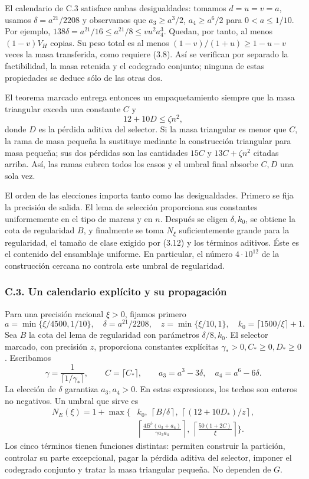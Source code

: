 \documentclass[spanish,11pt,a4paper]{article}
\begin{document}
El calendario de C.3 satisface ambas desigualdades: tomamos \(d=u=v=a\), usamos \(\delta=a^{21}/2208\) y observamos que \(a_3\ge a^3/2\), \(a_4\ge a^6/2\) para \(0<a\le1/10\). Por ejemplo, \(138\delta=a^{21}/16\le a^{21}/8\le vu^2a_4^3\). Quedan, por tanto, al menos \((1-v)V_H\) copias. Su peso total es al menos \((1-v)/(1+u)\ge1-u-v\) veces la masa transferida, como requiere (3.8). Así se verifican por separado la factibilidad, la masa retenida y el codegrado conjunto; ninguna de estas propiedades se deduce sólo de las otras dos.

El teorema marcado entrega entonces un empaquetamiento siempre que la masa triangular exceda una constante \(C\) y \[
12+10D\le\zeta n^2,
\tag{3.14}
\] donde \(D\) es la pérdida aditiva del selector. Si la masa triangular es menor que \(C\), la rama de masa pequeña la sustituye mediante la construcción triangular para masa pequeña; sus dos pérdidas son las cantidades \(15C\) y \(13C+\zeta n^2\) citadas arriba. Así, las ramas cubren todos los casos y el umbral final absorbe \(C,D\) una sola vez.

El orden de las elecciones importa tanto como las desigualdades. Primero se fija la precisión de salida. El lema de selección proporciona sus constantes uniformemente en el tipo de marcas y en \(n\). Después se eligen \(\delta,k_0\), se obtiene la cota de regularidad \(B\), y finalmente se toma \(N_\xi\) suficientemente grande para la regularidad, el tamaño de clase exigido por (3.12) y los términos aditivos. Éste es el contenido del ensamblaje uniforme. En particular, el número \(4\cdot10^{12}\) de la construcción cercana no controla este umbral de regularidad.

\subsubsection{C.3. Un calendario explícito y su propagación}\label{c.3.-un-calendario-explicito-y-su-propagacion}

Para una precisión racional \(\xi>0\), fijamos primero \[
a=\min\{\xi/4500,1/10\},\quad
\delta=a^{21}/2208,\quad z=\min\{\xi/10,1\},\quad
k_0=\lceil1500/\xi\rceil+1.
\] Sea \(B\) la cota del lema de regularidad con parámetros \(\delta/8,k_0\). El selector marcado, con precisión \(z\), proporciona constantes explícitas \(\gamma_*>0,C_*\ge0,D_*\ge0\). Escribamos \[
\gamma=\frac1{\lceil1/\gamma_*\rceil},\qquad C=\lceil C_*\rceil,\qquad
a_3=a^3-3\delta,\quad a_4=a^6-6\delta.
\] La elección de \(\delta\) garantiza \(a_3,a_4>0\). En estas expresiones, los techos son enteros no negativos. Un umbral que sirve es \[
\begin{split}
N_E(\xi)=1+\max\biggl\{&
k_0,\ \left\lceil B/\delta\right\rceil,\
\left\lceil(12+10D_*)/z\right\rceil,\\
&\left\lceil\frac{4B^5(a_3+a_4)}{\gamma a_3a_4}\right\rceil,\
\left\lceil\frac{50(1+2C)}{\xi}\right\rceil
\biggr\}.
\end{split}
\tag{C.1}
\] Los cinco términos tienen funciones distintas: permiten construir la partición, controlar su parte excepcional, pagar la pérdida aditiva del selector, imponer el codegrado conjunto y tratar la masa triangular pequeña. No dependen de \(G\).
\end{document}
